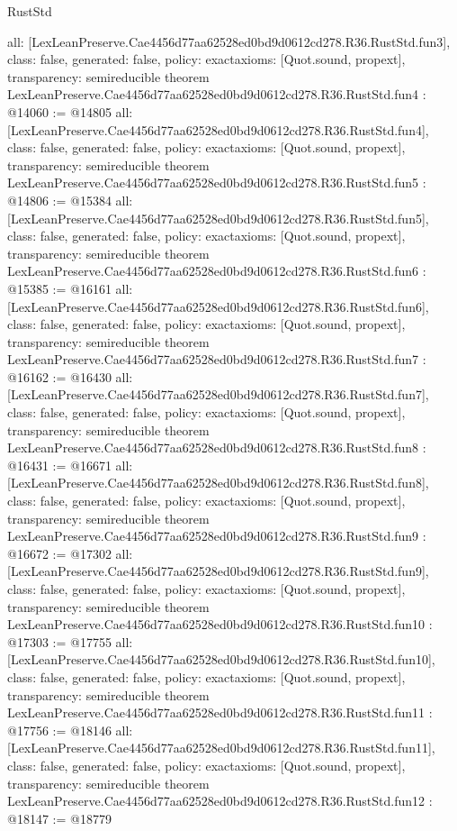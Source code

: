 \begin{lexlean}{RustStd}
\begin{coremodule}
{  all: [LexLeanPreserve.Cae4456d77aa62528ed0bd9d0612cd278.R36.RustStd.fun3],
  class: false,
  generated: false,
  policy: exact{axioms: [Quot.sound, propext]},
  transparency: semireducible
}
theorem LexLeanPreserve.Cae4456d77aa62528ed0bd9d0612cd278.R36.RustStd.fun4 : @14060 := @14805 {
  all: [LexLeanPreserve.Cae4456d77aa62528ed0bd9d0612cd278.R36.RustStd.fun4],
  class: false,
  generated: false,
  policy: exact{axioms: [Quot.sound, propext]},
  transparency: semireducible
}
theorem LexLeanPreserve.Cae4456d77aa62528ed0bd9d0612cd278.R36.RustStd.fun5 : @14806 := @15384 {
  all: [LexLeanPreserve.Cae4456d77aa62528ed0bd9d0612cd278.R36.RustStd.fun5],
  class: false,
  generated: false,
  policy: exact{axioms: [Quot.sound, propext]},
  transparency: semireducible
}
theorem LexLeanPreserve.Cae4456d77aa62528ed0bd9d0612cd278.R36.RustStd.fun6 : @15385 := @16161 {
  all: [LexLeanPreserve.Cae4456d77aa62528ed0bd9d0612cd278.R36.RustStd.fun6],
  class: false,
  generated: false,
  policy: exact{axioms: [Quot.sound, propext]},
  transparency: semireducible
}
theorem LexLeanPreserve.Cae4456d77aa62528ed0bd9d0612cd278.R36.RustStd.fun7 : @16162 := @16430 {
  all: [LexLeanPreserve.Cae4456d77aa62528ed0bd9d0612cd278.R36.RustStd.fun7],
  class: false,
  generated: false,
  policy: exact{axioms: [Quot.sound, propext]},
  transparency: semireducible
}
theorem LexLeanPreserve.Cae4456d77aa62528ed0bd9d0612cd278.R36.RustStd.fun8 : @16431 := @16671 {
  all: [LexLeanPreserve.Cae4456d77aa62528ed0bd9d0612cd278.R36.RustStd.fun8],
  class: false,
  generated: false,
  policy: exact{axioms: [Quot.sound, propext]},
  transparency: semireducible
}
theorem LexLeanPreserve.Cae4456d77aa62528ed0bd9d0612cd278.R36.RustStd.fun9 : @16672 := @17302 {
  all: [LexLeanPreserve.Cae4456d77aa62528ed0bd9d0612cd278.R36.RustStd.fun9],
  class: false,
  generated: false,
  policy: exact{axioms: [Quot.sound, propext]},
  transparency: semireducible
}
theorem LexLeanPreserve.Cae4456d77aa62528ed0bd9d0612cd278.R36.RustStd.fun10 : @17303 := @17755 {
  all: [LexLeanPreserve.Cae4456d77aa62528ed0bd9d0612cd278.R36.RustStd.fun10],
  class: false,
  generated: false,
  policy: exact{axioms: [Quot.sound, propext]},
  transparency: semireducible
}
theorem LexLeanPreserve.Cae4456d77aa62528ed0bd9d0612cd278.R36.RustStd.fun11 : @17756 := @18146 {
  all: [LexLeanPreserve.Cae4456d77aa62528ed0bd9d0612cd278.R36.RustStd.fun11],
  class: false,
  generated: false,
  policy: exact{axioms: [Quot.sound, propext]},
  transparency: semireducible
}
theorem LexLeanPreserve.Cae4456d77aa62528ed0bd9d0612cd278.R36.RustStd.fun12 : @18147 := @18779 {
}
\end{coremodule}
\end{lexlean}
